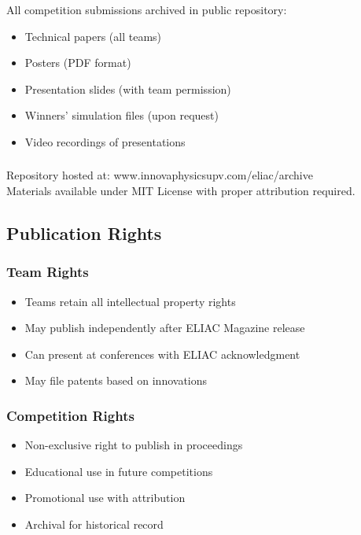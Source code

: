 \subsubsection{}
All competition submissions archived in public repository:
\begin{itemize}[noitemsep]
    \item Technical papers (all teams)
    \item Posters (PDF format)
    \item Presentation slides (with team permission)
    \item Winners' simulation files (upon request)
    \item Video recordings of presentations
\end{itemize}

\subsubsection{}
Repository hosted at: www.innovaphysicsupv.com/eliac/archive \\
Materials available under MIT License with proper attribution required.

\subsection{Publication Rights}

\subsubsection{Team Rights}
\begin{itemize}[noitemsep]
    \item Teams retain all intellectual property rights
    \item May publish independently after ELIAC Magazine release
    \item Can present at conferences with ELIAC acknowledgment
    \item May file patents based on innovations
\end{itemize}

\subsubsection{Competition Rights}
\begin{itemize}[noitemsep]
    \item Non-exclusive right to publish in proceedings
    \item Educational use in future competitions
    \item Promotional use with attribution
    \item Archival for historical record
\end{itemize}

